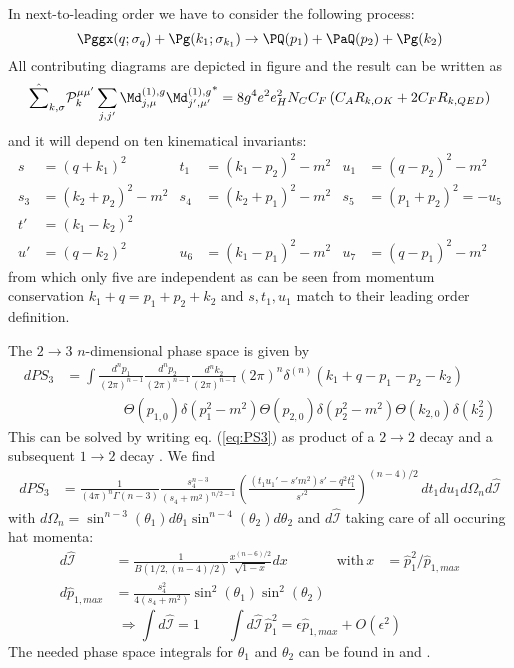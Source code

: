 \label{sec:NLO.g}
In next-to-leading order we have to consider the following process:
\begin{equation}
\Pggx(q;\sigma_q) + \Pg(k_1;\sigma_{k_1}) \rightarrow \PQ(p_1)+\PaQ(p_2) + \Pg(k_2)
\end{equation}
All contributing diagrams are depicted in figure  and the result can be written as
\begin{equation}
\hat\sum_{k,\sigma}\mathcal P_{k}^{\mu\mu'}\sum_{j,j'}{\Md^{(1),g}_{j,\mu}\Md^{(1),g}_{j',\mu'}}^* = 8g^4e^2e_H^2 N_C C_F\left( C_A R_{k,OK} + 2C_F R_{k,QED}\right)
\end{equation}
and it will depend on ten kinematical invariants:
\begin{align}
s &= (q+k_1)^2 &t_1 &=(k_1-p_2)^2-m^2 &u_1 &=(q-p_2)^2 -m^2\\
s_3 &= (k_2+p_2)^2-m^2 &s_4 &=(k_2+p_1)^2-m^2 &s_5 &= (p_1+p_2)^2=-u_5\\
t' &= (k_1-k_2)^2\\
u' &= (q-k_2)^2 &u_6 &=(k_1-p_1)^2-m^2 &u_7 &=(q-p_1)^2-m^2
\end{align}
from which only five are independent as can be seen from momentum conservation $k_1+q=p_1+p_2+k_2$ and $s,t_1,u_1$ match to their leading order definition.

The $2\rightarrow 3$ $n$-dimensional phase space is given by
\begin{align}
dPS_3 &= \!\int\!\!\frac{d^{n}p_1}{(2\pi)^{n-1}}\frac{d^{n}p_2}{(2\pi)^{n-1}}\frac{d^{n}k_2}{(2\pi)^{n-1}}(2\pi)^n\delta^{(n)}(k_1+q-p_1-p_2-k_2) \nonumber\\
 &\hspace{50pt}\Theta(p_{1,0})\delta(p_1^2-m^2)\Theta(p_{2,0})\delta(p_2^2-m^2)\Theta(k_{2,0})\delta(k_2^2) \label{eq:PS3}
\end{align}
This can be solved by writing eq. (\ref{eq:PS3}) as product of a $2\rightarrow 2$ decay and a subsequent $1\rightarrow 2$ decay \cite{PhysRevD4054}. We find
\begin{align}
dPS_3 &= \frac 1 {(4\pi)^n\Gamma(n-3)} \frac{s_4^{n-3}}{(s_4+m^2)^{n/2-1}}\left(\frac{(t_1u_1'-s'm^2)s' - q^2t_1^2}{s'^2}\right)^{(n-4)/2}\,dt_1 du_1 d\Omega_n d\hat{\mathcal I}
\end{align}
with $d\Omega_n = \sin^{n-3}(\theta_1)d\theta_1\sin^{n-4}(\theta_2)d\theta_2$ and $d\hat{\mathcal I}$ taking care of all occuring hat momenta:
\begin{align}
d\hat{\mathcal I} &= \frac 1 {B(1/2,(n-4)/2)}\frac{x^{(n-6)/2}}{\sqrt{1-x}}dx &\text{with}\,x &= \hat p_1^2/\hat p_{1,max}\\
d\hat p_{1,max} &= \frac{s_4^2}{4(s_4+m^2)}\sin^2(\theta_1)\sin^2(\theta_2)
\end{align}
\begin{equation}
\Rightarrow \int\!d\hat{\mathcal I} = 1 \qquad \int\!d\hat{\mathcal I}\,\hat p_1^2 = \epsilon \hat p_{1,max} + O(\epsilon^2)
\end{equation}
The needed phase space integrals for $\theta_1$ and $\theta_2$ can be found in \cite{PhysRevD4054} and \cite{Bojak:2000eu}.

